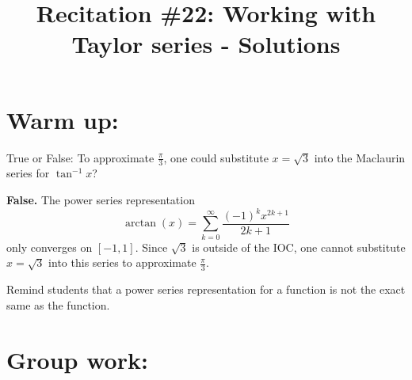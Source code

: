 \documentclass[noinstructornotes]{ximera}
\title{Recitation \#22: Working with Taylor series - Solutions}
\begin{document}
\begin{abstract}		\end{abstract}
\maketitle



\section{Warm up:}
True or False:  To approximate $\frac{\pi}{3}$, one could substitute $x = \sqrt{3}$ into the Maclaurin series for $\tan^{-1}x$?
	\begin{freeResponse}
	{\bf False.}  The power series representation 
		\[
		\arctan(x) = \sum_{k=0}^\infty \frac{(-1)^k x^{2k+1}}{2k+1}
		\]
	only converges on $[-1,1]$.  
	Since $\sqrt{3}$ is outside of the IOC, one cannot substitute $x=\sqrt{3}$ into this series to approximate $\frac{\pi}{3}$.  
	\end{freeResponse}	
\begin{instructorNotes}
Remind students that a power series representation for a function is not the exact same as the function.
\end{instructorNotes}







\section{Group work:}
\end{document}
